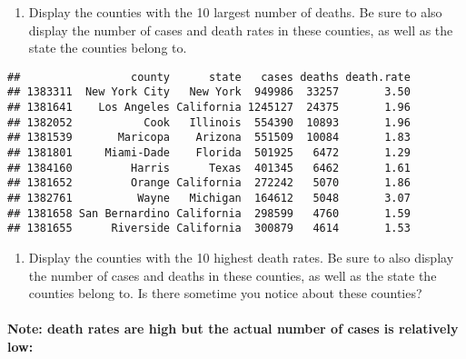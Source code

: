 \documentclass[
]{article}
\newenvironment{Shaded}{\begin{snugshade}}{\end{snugshade}}
\newcommand{\AttributeTok}[1]{\textcolor[rgb]{0.77,0.63,0.00}{#1}}
\newcommand{\ConstantTok}[1]{\textcolor[rgb]{0.00,0.00,0.00}{#1}}
\newcommand{\DecValTok}[1]{\textcolor[rgb]{0.00,0.00,0.81}{#1}}
\newcommand{\FunctionTok}[1]{\textcolor[rgb]{0.00,0.00,0.00}{#1}}
\newcommand{\NormalTok}[1]{#1}
\newcommand{\SpecialCharTok}[1]{\textcolor[rgb]{0.00,0.00,0.00}{#1}}
\providecommand{\tightlist}{%
  \setlength{\itemsep}{0pt}\setlength{\parskip}{0pt}}
\begin{document}
\begin{enumerate}
\def\labelenumi{\alph{enumi}.}
\setcounter{enumi}{3}
\tightlist
\item
  Display the counties with the 10 largest number of deaths. Be sure to
  also display the number of cases and death rates in these counties, as
  well as the state the counties belong to.
\end{enumerate}

\begin{Shaded}
\end{Shaded}

\begin{verbatim}
##                 county      state   cases deaths death.rate
## 1383311  New York City   New York  949986  33257       3.50
## 1381641    Los Angeles California 1245127  24375       1.96
## 1382052           Cook   Illinois  554390  10893       1.96
## 1381539       Maricopa    Arizona  551509  10084       1.83
## 1381801     Miami-Dade    Florida  501925   6472       1.29
## 1384160         Harris      Texas  401345   6462       1.61
## 1381652         Orange California  272242   5070       1.86
## 1382761          Wayne   Michigan  164612   5048       3.07
## 1381658 San Bernardino California  298599   4760       1.59
## 1381655      Riverside California  300879   4614       1.53
\end{verbatim}

\begin{enumerate}
\def\labelenumi{\alph{enumi}.}
\setcounter{enumi}{4}
\tightlist
\item
  Display the counties with the 10 highest death rates. Be sure to also
  display the number of cases and deaths in these counties, as well as
  the state the counties belong to. Is there sometime you notice about
  these counties?
\end{enumerate}

\hypertarget{note-death-rates-are-high-but-the-actual-number-of-cases-is-relatively-low}{%
\paragraph{Note: death rates are high but the actual number of cases is
relatively
low:}\label{note-death-rates-are-high-but-the-actual-number-of-cases-is-relatively-low}}
\end{document}
